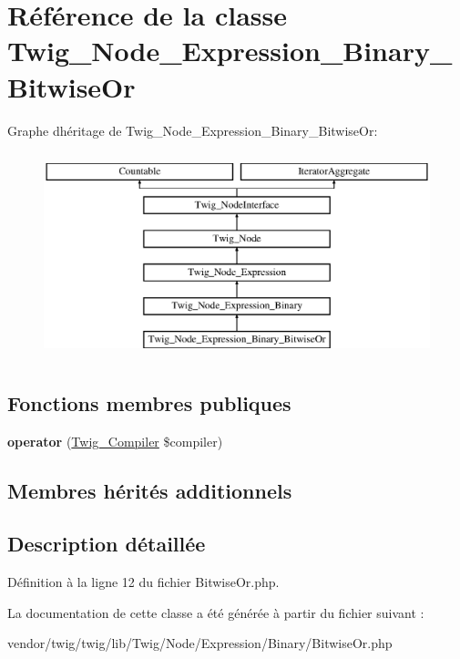 \hypertarget{class_twig___node___expression___binary___bitwise_or}{}\section{Référence de la classe Twig\+\_\+\+Node\+\_\+\+Expression\+\_\+\+Binary\+\_\+\+Bitwise\+Or}
\label{class_twig___node___expression___binary___bitwise_or}
Graphe d\textquotesingle{}héritage de Twig\+\_\+\+Node\+\_\+\+Expression\+\_\+\+Binary\+\_\+\+Bitwise\+Or\+:\begin{figure}[H]
\begin{center}
\leavevmode
\includegraphics[height=6.000000cm]{class_twig___node___expression___binary___bitwise_or}
\end{center}
\end{figure}
\subsection*{Fonctions membres publiques}
\begin{DoxyCompactItemize}
\item 
{\bfseries operator} (\hyperlink{class_twig___compiler}{Twig\+\_\+\+Compiler} \$compiler)\hypertarget{class_twig___node___expression___binary___bitwise_or_af77318ec88d5f8a508684970a150b670}{}\label{class_twig___node___expression___binary___bitwise_or_af77318ec88d5f8a508684970a150b670}

\end{DoxyCompactItemize}
\subsection*{Membres hérités additionnels}


\subsection{Description détaillée}


Définition à la ligne 12 du fichier Bitwise\+Or.\+php.



La documentation de cette classe a été générée à partir du fichier suivant \+:\begin{DoxyCompactItemize}
\item 
vendor/twig/twig/lib/\+Twig/\+Node/\+Expression/\+Binary/Bitwise\+Or.\+php\end{DoxyCompactItemize}
